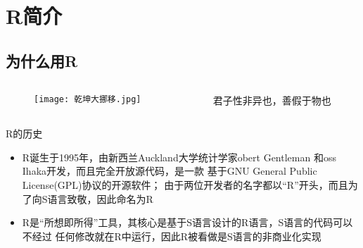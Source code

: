 
\section{R简介}
\subsection{为什么用R}
\begin{frame}{\subsecname}{}

  \begin{columns}
    \begin{column}{.5\textwidth}
      \begin{figure}
        \centering \texttt{[image: 乾坤大挪移.jpg]}
      \end{figure}
    \end{column}

    \begin{column}{.48\textwidth}
      \begin{ornamentblock}
        \centering
        {君子性非异也，善假于物也\\
          }
      \end{ornamentblock}
    \end{column}
  \end{columns}
\end{frame}

\begin{frame}[t]{\subsecname}{R的历史}

\begin{itemize}
\item<1-> R诞生于1995年，由新西兰Auckland大学统计学家obert Gentleman
        和oss Ihaka开发，而且完全开放源代码，是一款
        基于GNU General Public License(GPL)协议的开源软件；
由于两位开发者的名字都以“R”开头，而且为了向S语言致敬，因此命名为R
\item<2-> R是“所想即所得”工具，其核心是基于S语言设计的R语言，S语言的代码可以不经过
        任何修改就在R中运行，因此R被看做是S语言的非商业化实现  
\end{itemize}

\begin{overlayarea} {\textwidth}{\textheight}
    \begin{figure}\centering
      \captionsetup[subfigure]{labelformat=empty} 
       \vspace{1pt}
    \end{figure}
\end{overlayarea}

\end{frame}


